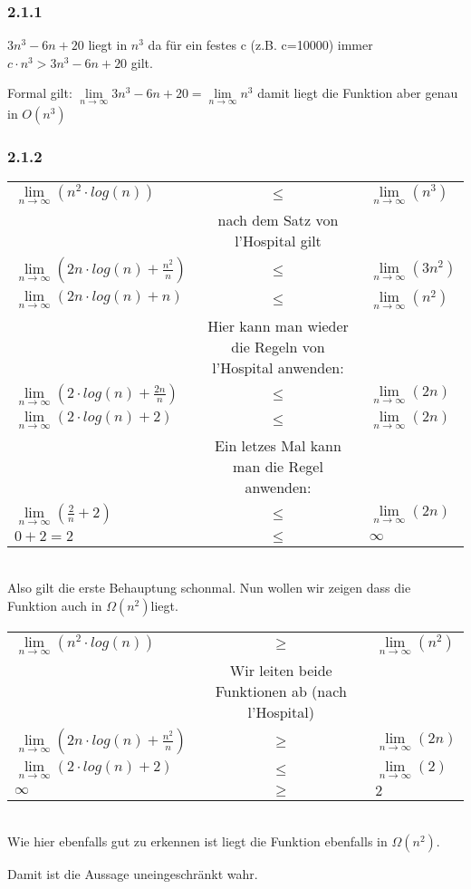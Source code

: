 \subsubsection*{2.1.1}
$3n^3 - 6n + 20$ liegt in $n^3$ da für ein festes c (z.B. c=10000) immer $c \cdot n^3 > 3n^3 - 6n + 20$ gilt.

Formal gilt: $ \lim\limits_{n \to \infty}3n^3-6n+20=\lim\limits_{n \to \infty}n^3 $ damit liegt die Funktion aber genau in $O(n^3)$

\subsubsection*{2.1.2}

\begin{tabular}{lcl}
$ \lim\limits_{n \to \infty}(n^2 \cdot log(n)) $&$\leq $&$ \lim\limits_{n \to \infty}(n^3) $\\
& nach dem Satz von l'Hospital gilt  & \\
$ \lim\limits_{n \to \infty}(2n \cdot log(n) + \frac{n^2}{n}) $&$\leq $&$ \lim\limits_{n \to \infty} (3n^2)$ \\
$ \lim\limits_{n \to \infty}(2n \cdot log(n) + n) $&$\leq $&$ \lim\limits_{n \to \infty} (n^2)$ \\
& Hier kann man wieder die Regeln von l'Hospital anwenden:  & \\
$ \lim\limits_{n \to \infty}(2 \cdot log(n) + \frac{2n}{n} ) $&$\leq $&$ \lim\limits_{n \to \infty} (2n)$ \\
$ \lim\limits_{n \to \infty}(2 \cdot log(n) + 2 ) $&$\leq $&$ \lim\limits_{n \to \infty} (2n)$ \\
& Ein letzes Mal kann man die Regel anwenden: & \\
$ \lim\limits_{n \to \infty}(\frac{2}{n}+2 ) $&$\leq $&$ \lim\limits_{n \to \infty} (2n)$ \\
$ 0 + 2=2  $&$\leq $&$ \infty$ \\
\end{tabular} \\

Also gilt die erste Behauptung schonmal. Nun wollen wir zeigen dass die Funktion auch in $\Omega(n^2)$liegt.

\begin{tabular}{lcl}
$ \lim\limits_{n \to \infty}(n^2 \cdot log(n)) $&$\geq $&$ \lim\limits_{n \to \infty}(n^2) $\\
& Wir leiten beide Funktionen ab (nach l'Hospital) &\\
$ \lim\limits_{n \to \infty}(2n \cdot log(n) + \frac{n^2}{n}) $&$\geq $&$ \lim\limits_{n \to \infty} (2 n)$ \\
$ \lim\limits_{n \to \infty}(2 \cdot log(n) + 2) $&$\leq $&$ \lim\limits_{n \to \infty} (2)$ \\
$ \infty $&$\geq$& $ 2 $
\end{tabular} \\

Wie hier ebenfalls gut zu erkennen ist liegt die Funktion ebenfalls in $\Omega(n^2)$.

Damit ist die Aussage uneingeschränkt wahr.

